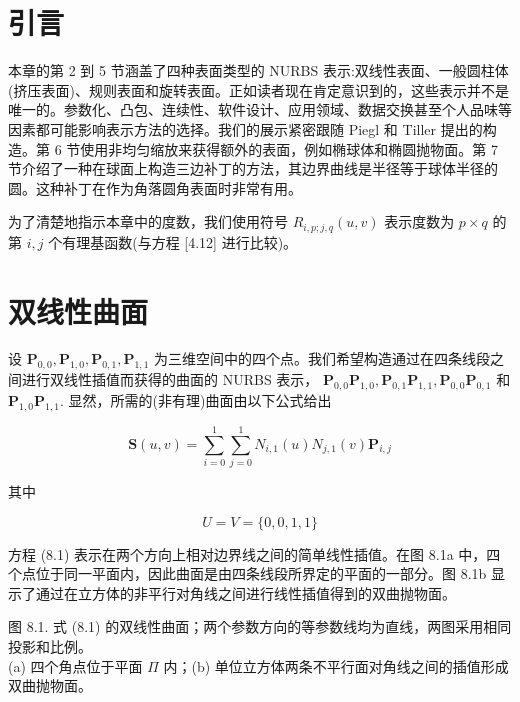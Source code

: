\documentclass[../main.tex]{subfiles}
\begin{document}
\section{引言}

本章的第 2 到 5 节涵盖了四种表面类型的 NURBS 表示:双线性表面、一般圆柱体(挤压表面)、规则表面和旋转表面。正如读者现在肯定意识到的，这些表示并不是唯一的。参数化、凸包、连续性、软件设计、应用领域、数据交换甚至个人品味等因素都可能影响表示方法的选择。我们的展示紧密跟随 Piegl 和 Tiller \cite{Pieg87a} 提出的构造。第 6 节使用非均匀缩放来获得额外的表面，例如椭球体和椭圆抛物面。第 7 节介绍了一种在球面上构造三边补丁的方法，其边界曲线是半径等于球体半径的圆。这种补丁在作为角落圆角表面时非常有用。

为了清楚地指示本章中的度数，我们使用符号 \({R}_{i,p;j,q}\left( {u,v}\right)\) 表示度数为 \(p \times  q\) 的第 \(i,j\) 个有理基函数(与方程 [4.12] 进行比较)。



\section{双线性曲面}

设 \({\mathbf{P}}_{0,0},{\mathbf{P}}_{1,0},{\mathbf{P}}_{0,1},{\mathbf{P}}_{1,1}\) 为三维空间中的四个点。我们希望构造通过在四条线段之间进行双线性插值而获得的曲面的 NURBS 表示， \({\mathbf{P}}_{0,0}{\mathbf{P}}_{1,0},{\mathbf{P}}_{0,1}{\mathbf{P}}_{1,1},{\mathbf{P}}_{0,0}{\mathbf{P}}_{0,1}\) 和 \({\mathbf{P}}_{1,0}{\mathbf{P}}_{1,1}.\) 显然，所需的(非有理)曲面由以下公式给出

\[
\mathbf{S}\left( {u,v}\right)  = \mathop{\sum }\limits_{{i = 0}}^{1}\mathop{\sum }\limits_{{j = 0}}^{1}{N}_{i,1}\left( u\right) {N}_{j,1}\left( v\right) {\mathbf{P}}_{i,j} \tag{8.1}
\]

其中

\[
U = V = \{ 0,0,1,1\}
\]

方程 (8.1) 表示在两个方向上相对边界线之间的简单线性插值。在图 8.1a 中，四个点位于同一平面内，因此曲面是由四条线段所界定的平面的一部分。图 8.1b 显示了通过在立方体的非平行对角线之间进行线性插值得到的双曲抛物面。



\begin{center}
\begin{minipage}{30cm}
\vspace*{.6\baselineskip}
\centering
{}
\par\smallskip
图 8.1. 式 (8.1) 的双线性曲面；两个参数方向的等参数线均为直线，两图采用相同投影和比例。\\
(a) 四个角点位于平面 $\Pi$ 内；(b) 单位立方体两条不平行面对角线之间的插值形成双曲抛物面。
\end{minipage}
\end{center}
\end{document}
